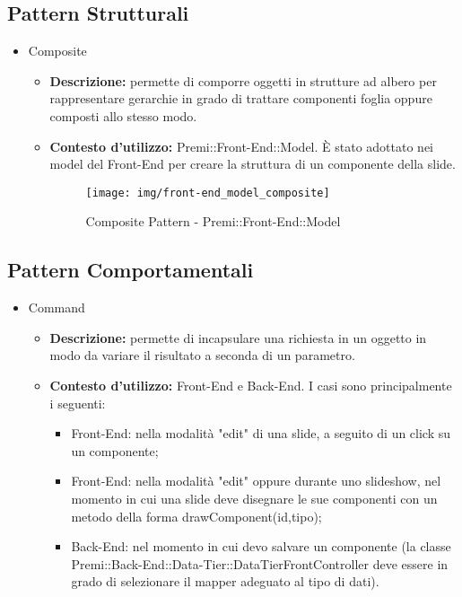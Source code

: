 \newpage

\subsection{Pattern Strutturali}
\begin{itemize}
	\item Composite
	\begin{itemize}
		\item \textbf{Descrizione:} permette di comporre oggetti in strutture ad albero per rappresentare gerarchie in grado di trattare componenti foglia oppure composti allo stesso modo.
		\item \textbf{Contesto d'utilizzo:} Premi::Front-End::Model. È stato adottato nei model del \gls{Front-End} per creare la struttura di un componente della slide. 
		\begin{figure}[h]
			\centering
			\texttt{[image: img/front-end\_model\_composite]}
			\caption[Composite Pattern - Premi::Front-End::Model]{Composite Pattern - Premi::Front-End::Model}
		\end{figure}
	\end{itemize}

\end{itemize}

\subsection{Pattern Comportamentali}
\begin{itemize}
	\item Command
	\begin{itemize}
		\item \textbf{Descrizione:} permette di incapsulare una richiesta in un oggetto in modo da variare il risultato a seconda di un parametro.
		\item \textbf{Contesto d'utilizzo:} \gls{Front-End} e \gls{Back-End}. I casi sono principalmente i seguenti:
		\begin{itemize}
			\item \gls{Front-End}: nella modalità "edit" di una \gls{slide}, a seguito di un click su un componente;
			\item \gls{Front-End}: nella modalità "edit" oppure durante uno slideshow, nel momento in cui una \gls{slide} deve disegnare le sue componenti con un metodo della forma drawComponent(id,tipo);
			\item \gls{Back-End}: nel momento in cui devo salvare un componente (la classe Premi::\gls{Back-End}::Data-Tier::DataTierFrontController deve essere in grado di selezionare il mapper adeguato al tipo di dati).
		\end{itemize}
	\end{itemize}
\end{itemize}


